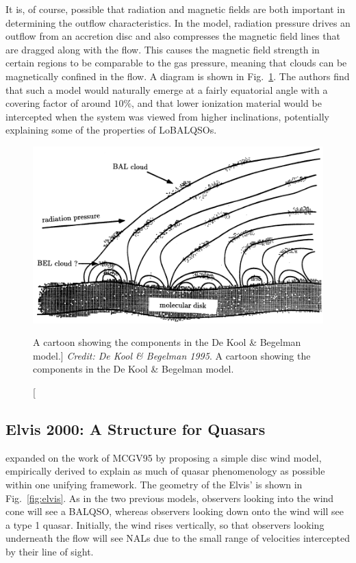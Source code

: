 It is, of course, possible that radiation and magnetic fields are both important
in determining the outflow characteristics. In the \cite{dekool1995} model, radiation
pressure drives an outflow from an accretion disc and also compresses the magnetic
field lines that are dragged along with the flow. This causes the magnetic field
strength in certain regions to be comparable to the gas pressure, meaning that clouds
can be magnetically confined in the flow. A diagram is shown in Fig.~\ref{fig:dekool}.
The authors find that such a model would naturally emerge at a fairly equatorial
angle with a covering factor of around $10\%$, and that lower ionization material 
would be intercepted when the system was viewed from higher inclinations, potentially
explaining some of the properties of LoBALQSOs.

\begin{figure}
\centering
\includegraphics[width=1.0\textwidth]{figures/02-outflows/dekool.png}
\caption
[A cartoon showing the components in the De Kool \& Begelman model.]
{
{\sl Credit: De Kool \& Begelman 1995}. 
A cartoon showing the components in the De Kool \& Begelman model.
} 
\label{fig:dekool}
\end{figure}


\subsection{Elvis 2000: A Structure for Quasars}

\cite{elvis2000} expanded on the work of MCGV95 by proposing a simple
disc wind model, empirically derived to explain as much of quasar phenomenology
as possible within one unifying framework. The geometry of the Elvis'
is shown in Fig.~\ref{fig:elvis}. As in the two previous models, observers 
looking into the wind cone will see a BALQSO, whereas observers looking down onto
the wind will see a type 1 quasar. Initially, the wind rises vertically, so
that observers looking underneath the flow will see NALs
due to the small range of velocities intercepted by their line of sight. 

